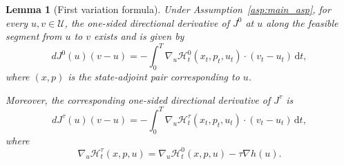\documentclass[10pt,a4paper]{amsart}
\newtheorem{lemma}{Lemma}
\newcommand{\dd}{\,\mathrm{d}}
\begin{document}
\begin{lemma}[First variation formula]\label{lem:first-variation}
Under Assumption~\ref{asp:main_asp}, for every $u,v\in\mathcal U$,
the one-sided directional derivative of $J^0$ at $u$ along the feasible segment from $u$ to $v$ exists and is given by
\begin{equation}\label{eq:first-var-J0}
dJ^0(u)(v-u)
=
-\int_0^T \nabla_u \mathcal H_t^0(x_t,p_t,u_t)\cdot (v_t-u_t)\dd t,
\end{equation}
where $(x, p)$ is the state-adjoint pair corresponding to $u$.

Moreover, the corresponding one-sided directional derivative of $J^\tau$ is
\begin{equation}\label{eq:first-var-Jtau}
dJ^\tau(u)(v-u)
=
- \int_0^T \nabla_u \mathcal H_t^\tau(x_t,p_t,u_t)\cdot (v_t-u_t)\dd t,
\end{equation}
where
\[
\nabla_u \mathcal H_t^\tau(x,p,u)
=
\nabla_u \mathcal H_t^0(x,p,u) - \tau \nabla h(u).
\]
\end{lemma}
\end{document}
